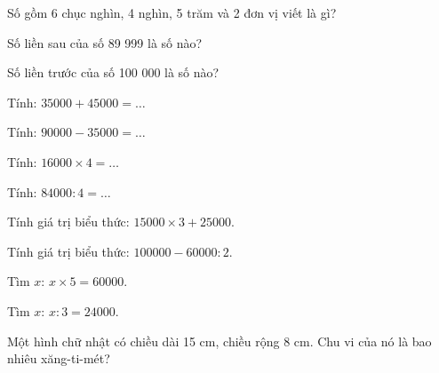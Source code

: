 \begin{ex}
Số gồm 6 chục nghìn, 4 nghìn, 5 trăm và 2 đơn vị viết là gì?
\end{ex}

\begin{ex}
Số liền sau của số 89 999 là số nào?
\end{ex}

\begin{ex}
Số liền trước của số 100 000 là số nào?
\end{ex}

\begin{ex}
Tính: $35000 + 45000 = \dots$
\end{ex}

\begin{ex}
Tính: $90000 - 35000 = \dots$
\end{ex}

\begin{ex}
Tính: $16000 \times 4 = \dots$
\end{ex}

\begin{ex}
Tính: $84000 : 4 = \dots$
\end{ex}

\begin{ex}
Tính giá trị biểu thức: $15000 \times 3 + 25000$.
\end{ex}

\begin{ex}
Tính giá trị biểu thức: $100000 - 60000 : 2$.
\end{ex}

\begin{ex}
Tìm $x$: $x \times 5 = 60000$.
\end{ex}

\begin{ex}
Tìm $x$: $x : 3 = 24000$.
\end{ex}

\begin{ex}
Một hình chữ nhật có chiều dài 15 cm, chiều rộng 8 cm. Chu vi của nó là bao nhiêu xăng-ti-mét?
\end{ex}

